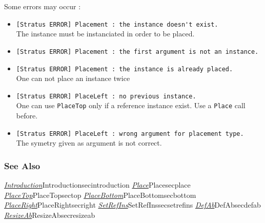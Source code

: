 Some errors may occur :    
\begin{itemize}
    \item \verb-[Stratus ERROR] Placement : the instance doesn't exist.-\\The instance must be instanciated in order to be placed.
    \item \verb-[Stratus ERROR] Placement : the first argument is not an instance.-
    \item \verb-[Stratus ERROR] Placement : the instance is already placed.-\\One can not place an instance twice    
    \item \verb-[Stratus ERROR] PlaceLeft : no previous instance.-\\One can use \verb-PlaceTop- only if a reference instance exist. Use a \verb-Place- call before. 
    \item \verb-[Stratus ERROR] PlaceLeft : wrong argument for placement type.-\\The symetry given as argument is not correct.
\end{itemize}

\subsubsection{See Also}

\hyperref[ref]{\emph{Introduction}}{}{Introduction}{secintroduction}
\hyperref[ref]{\emph{Place}}{}{Place}{secplace}
\hyperref[ref]{\emph{PlaceTop}}{}{PlaceTop}{sectop}
\hyperref[ref]{\emph{PlaceBottom}}{}{PlaceBottom}{secbottom}
\hyperref[ref]{\emph{PlaceRight}}{}{PlaceRight}{secright}
\hyperref[ref]{\emph{SetRefIns}}{}{SetRefIns}{secsetrefins}
\hyperref[ref]{\emph{DefAb}}{}{DefAb}{secdefab}
\hyperref[ref]{\emph{ResizeAb}}{}{ResizeAb}{secresizeab}
